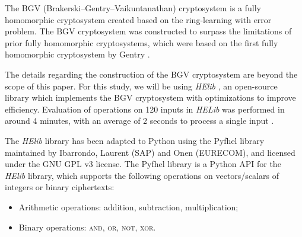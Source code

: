 The BGV (Brakerski--Gentry--Vaikuntanathan) cryptosystem \cite{cryptoeprint:2011:277} is a fully homomorphic cryptosystem created based on the ring-learning with error problem. The BGV cryptosystem was constructed to surpass the limitations of prior fully homomorphic cryptosystems, which were based on the first fully homomorphic cryptosystem by Gentry \cite{gentry_fully_2009}.

The details regarding the construction of the BGV cryptosystem are beyond the scope of this paper. For this study, we will be using \textit{HElib} \cite{garay_algorithms_2014}, an open-source library which implements the BGV cryptosystem with optimizations to improve efficiency. Evaluation of operations on 120 inputs in \textit{HELib} was performed in around 4 minutes, with an average of 2 seconds to process a single input \cite{hutchison_fully_2010,cryptoeprint:2011:566}.

The \textit{HElib} library has been adapted to Python using the Pyfhel library \cite{pyfhel_2018} maintained by Ibarrondo, Laurent (SAP) and Onen (EURECOM), and licensed under the GNU GPL v3 license. The Pyfhel library is a Python API for the \textit{HElib} library, which supports the following operations on vectors/scalars of integers or binary ciphertexts:
\begin{itemize}
	\item Arithmetic operations: addition, subtraction, multiplication;
	\item Binary operations: \textsc{and}, \textsc{or}, \textsc{not}, \textsc{xor}.
\end{itemize}

